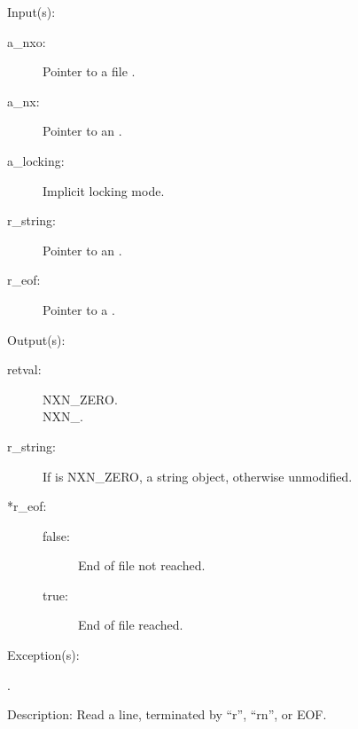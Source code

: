 \begin{capi}
\label{nxo_file_readline}
	\begin{capilist}
	\item[Input(s): ]
		\begin{description}\item[]
		\item[a\_nxo: ]
			Pointer to a file .
		\item[a\_nx: ]
			Pointer to an .
		\item[a\_locking: ]
			Implicit locking mode.
		\item[r\_string: ]
			Pointer to an .
		\item[r\_eof: ]
			Pointer to a .
		\end{description}
	\item[Output(s): ]
		\begin{description}\item[]
		\item[retval: ]
			\begin{description}\item[]
			\item[NXN\_ZERO.]
			\item[NXN\_.]
			\end{description}
		\item[r\_string: ]
			If  is NXN\_ZERO, a string object,
			otherwise unmodified.
		\item[*r\_eof: ]
			\begin{description}\item[]
			\item[false: ]
				End of file not reached.
			\item[true: ]
				End of file reached.
			\end{description}
		\end{description}
	\item[Exception(s): ]
		\begin{description}\item[]
		\item[.]
		\end{description}
	\item[Description: ]
		Read a line, terminated by ``{\bs}r'', ``{\bs}r{\bs}n'', or EOF.
	\end{capilist}

\end{capi}
